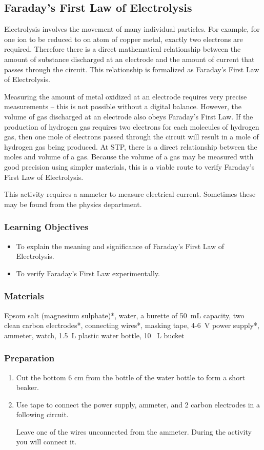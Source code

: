 \subsection{Faraday's First Law of Electrolysis}

Electrolysis involves the movement of many individual particles. For example, for one  ion to be reduced to on atom of copper metal, exactly two electrons are required. Therefore there is a direct mathematical relationship between the amount of substance discharged at an electrode and the amount of current that passes through the circuit. This relationship is formalized as Faraday's First Law of Electrolysis.

Measuring the amount of metal oxidized at an electrode requires very precise measurements -- this is not possible without a digital balance. However, the volume of gas discharged at an electrode also obeys Faraday's First Law. If the production of hydrogen gas requires two electrons for each molecules of hydrogen gas, then one mole of electrons passed through the circuit will result in a mole of hydrogen gas being produced. At STP, there is a direct relationship between the moles and volume of a gas. Because the volume of a gas may be measured with good precision using simpler materials, this is a viable route to verify Faraday's First Law of Electrolysis.

This activity requires a ammeter to measure electrical current. Sometimes these may be found from the physics department.

\subsubsection*{Learning Objectives}
\begin{itemize}
\item{To explain the meaning and significance of Faraday's First Law of Electrolysis.}
\item{To verify Faraday's First Law experimentally.}
\end{itemize}

\subsubsection*{Materials}
Epsom salt (magnesium sulphate)*, water, a burette of 50~mL capacity, two clean carbon electrodes*, connecting wires*, masking tape, 4-6~V power supply*, ammeter, watch, 1.5~L plastic water bottle, 10~ L bucket

\subsubsection*{Preparation}
\begin{enumerate}
\item{Cut the bottom 6 cm from the bottle of the water bottle to form a short beaker.}
\item{Use tape to connect the power supply, ammeter, and 2 carbon electrodes in a following circuit. }

Leave one of the wires unconnected from the ammeter. During the activity you will connect it.
\end{enumerate}

